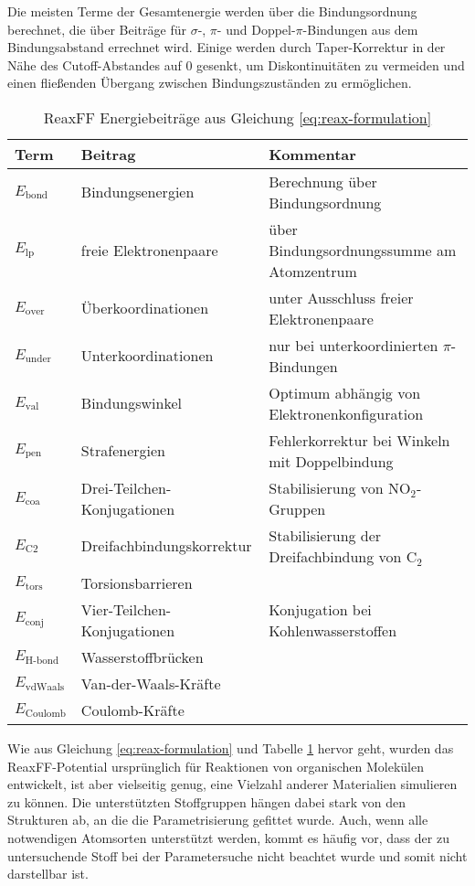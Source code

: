 Die meisten Terme der Gesamtenergie werden über die Bindungsordnung berechnet, die über Beiträge für $\sigma$-, $\pi$- und Doppel-$\pi$-Bindungen aus dem Bindungsabstand errechnet wird.
Einige werden durch Taper-Korrektur in der Nähe des Cutoff-Abstandes auf 0 gesenkt, um Diskontinuitäten zu vermeiden und einen fließenden Übergang zwischen Bindungszuständen zu ermöglichen.


\begin{table}
  \begin{tabularx}{\textwidth}{|llX|}
    \hline
    \textbf{Term} & \textbf{Beitrag} & \textbf{Kommentar} \\
    \hline
    $E_\text{bond}$ & Bindungsenergien & Berechnung über Bindungsordnung\\
    $E_\text{lp}$ & freie Elektronenpaare & über Bindungsordnungssumme am Atomzentrum\\
    $E_\text{over}$ & Überkoordinationen & unter Ausschluss freier Elektronenpaare\\
    $E_\text{under}$ & Unterkoordinationen & nur bei unterkoordinierten $\pi$-Bindungen\\
    $E_\text{val}$ & Bindungswinkel & Optimum abhängig von Elektronenkonfiguration\\
    $E_\text{pen}$ & Strafenergien & Fehlerkorrektur bei Winkeln mit Doppelbindung\\
    $E_\text{coa}$ & Drei-Teilchen-Konjugationen & Stabilisierung von NO$_2$-Gruppen\\
    $E_\text{C2}$ & Dreifachbindungskorrektur & Stabilisierung der Dreifachbindung von C$_2$\\
    $E_\text{tors}$ & Torsionsbarrieren & \\
    $E_\text{conj}$ & Vier-Teilchen-Konjugationen & Konjugation bei Kohlenwasserstoffen\\
    $E_\text{H-bond}$ & Wasserstoffbrücken & \\
    $E_\text{vdWaals}$ & Van-der-Waals-Kräfte & \\
    $E_\text{Coulomb}$ & Coulomb-Kräfte & \\
    \hline
  \end{tabularx}
  \caption[ReaxFF Energiebeiträge]{ReaxFF Energiebeiträge aus Gleichung \ref{eq:reax-formulation}}
  \label{tab:reax-energies}
\end{table}

Wie aus Gleichung \ref{eq:reax-formulation} und Tabelle \ref{tab:reax-energies} hervor geht, wurden das ReaxFF-Potential ursprünglich für Reaktionen von organischen Molekülen entwickelt, ist aber vielseitig genug, eine Vielzahl anderer Materialien simulieren zu können.
Die unterstützten Stoffgruppen hängen dabei stark von den Strukturen ab, an die die Parametrisierung gefittet wurde.
Auch, wenn alle notwendigen Atomsorten unterstützt werden, kommt es häufig vor, dass der zu untersuchende Stoff bei der Parametersuche nicht beachtet wurde und somit nicht darstellbar ist.

